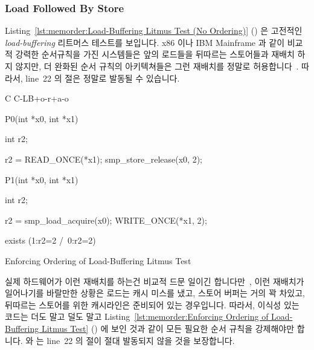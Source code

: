 \subsubsection{Load Followed By Store}
\label{sec:memorder:Load Followed By Store}

Listing~\ref{lst:memorder:Load-Buffering Litmus Test (No Ordering)}
()
은 고전적인 \emph{load-buffering} 리트머스 테스트를 보입니다.
x86 이나 IBM Mainframe 과 같이 비교적 강력한 순서규칙을 가진 시스템들은 앞의
로드들을 뒤따르는 스토어들과 재배치 하지 않지만, 더 완화된 순서 규칙의
아키텍쳐들은 그런 재배치를 정말로 허용합니다~\cite{JadeAlglave2011ppcmem}.
따라서, line~22 의  절은 정말로 발동될 수 있습니다.

\begin{listing}[tbp]
{ \scriptsize
\begin{verbbox}[\LstLineNo]
C C-LB+o-r+a-o
{
}

P0(int *x0, int *x1)
{
  int r2;

  r2 = READ_ONCE(*x1);
  smp_store_release(x0, 2);
}


P1(int *x0, int *x1)
{
  int r2;

  r2 = smp_load_acquire(x0);
  WRITE_ONCE(*x1, 2);
}

exists (1:r2=2 /\ 0:r2=2)
\end{verbbox}
}
\centering
\theverbbox
\caption{Enforcing Ordering of Load-Buffering Litmus Test}
\label{lst:memorder:Enforcing Ordering of Load-Buffering Litmus Test}
\end{listing}

실제 하드웨어가 이런 재배치를 하는건 비교적 드문
일이긴 합니다만~\cite{LucMaranget2017aarch64},
이런 재배치가 일어나기를 바랄만한 상황은 로드는 캐시 미스를 냈고, 스토어 버퍼는
거의 꽉 차있고, 뒤따르는 스토어를 위한 캐시라인은 준비되어 있는 경우입니다.
따라서, 이식성 있는 코드는 더도 말고 덜도 말고
Listing~\ref{lst:memorder:Enforcing Ordering of Load-Buffering Litmus Test}
()
에 보인 것과 같이 모든 필요한 순서 규칙을 강제해야만 합니다.
 와  는 line~22 의 
절이 절대 발동되지 않을 것을 보장합니다.
\iffalse

